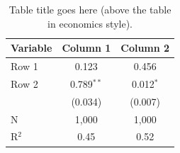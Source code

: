 

\begin{table}[H]
    \centering
    \caption{Table title goes here (above the table in economics style).}
    \label{tab:basic}
    \begin{tabular}{lcc}        %
        \toprule
        Variable & Column 1 & Column 2 \\
        \midrule
        Row 1    & 0.123    & 0.456    \\
        Row 2    & 0.789$^{**}$ & 0.012$^{*}$ \\
                 & (0.034)  & (0.007)  \\       %
        \midrule
        N        & 1,000    & 1,000    \\
        R$^2$    & 0.45     & 0.52     \\
        \bottomrule
    \end{tabular}
\end{table}



